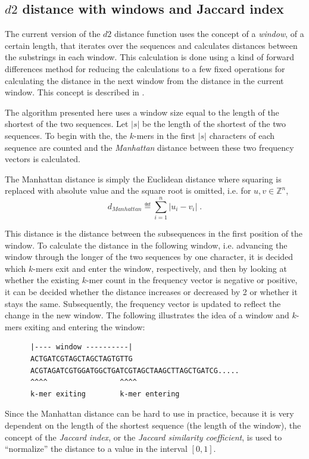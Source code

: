 \subsection{$d2$ distance with windows and Jaccard index}
The current version of the $d2$ distance function uses the concept of a
\emph{window}, of a certain length, that iterates over the sequences and
calculates distances between the substrings in each window. This calculation is
done using a kind of forward differences method for reducing the calculations
to a few fixed operations for calculating the distance in the next window from
the distance in the current window. This concept is described in
\cite{hazelhurst}.

The algorithm presented here uses a window size equal to the length of the
shortest of the two sequences. Let $|s|$ be the length of the shortest of the
two sequences. To begin with the, the $k$-mers in the first $|s|$ characters of
each sequence are counted and the \emph{Manhattan} distance between these two
frequency vectors is calculated.

The Manhattan distance is simply the Euclidean distance where squaring is
replaced with absolute value and the square root is omitted, i.e. for
$u, v \in \mathbb{Z}^n$, 
\begin{equation}
  d_{Manhattan} \eqdef \sum_{i=1}^{n} |u_i - v_i| \;.
\end{equation}

This distance is the distance between the subsequences in the first position of
the window. To calculate the distance in the following window, i.e. advancing
the window through the longer of the two sequences by one character, it is
decided which $k$-mers exit and enter the window, respectively, and then by
looking at whether the existing $k$-mer count in the frequency vector is
negative or positive, it can be decided whether the distance increases or
decreased by 2 or whether it stays the same. Subsequently, the frequency vector
is updated to reflect the change in the new window. The following illustrates
the idea of a window and $k$-mers exiting and entering the window:
\begin{verbatim}
      |---- window ----------|
      ACTGATCGTAGCTAGCTAGTGTTG
      ACGTAGATCGTGGATGGCTGATCGTAGCTAAGCTTAGCTGATCG.....
      ^^^^                 ^^^^
      k-mer exiting        k-mer entering
\end{verbatim}

Since the Manhattan distance can be hard to use in practice, because it is very
dependent on the length of the shortest sequence (the length of the window),
the concept of the \emph{Jaccard index}, or the \emph{Jaccard similarity
coefficient}, is used to ``normalize'' the distance to a value in the interval
$[0,1]$.

